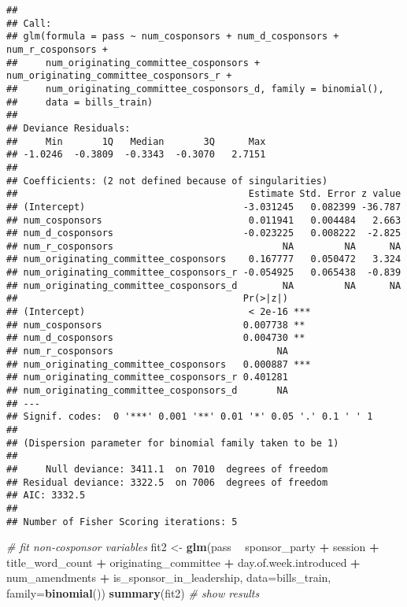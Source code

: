 \documentclass[]{article}
\newenvironment{Shaded}{\begin{snugshade}}{\end{snugshade}}
\newcommand{\KeywordTok}[1]{\textcolor[rgb]{0.13,0.29,0.53}{\textbf{#1}}}
\newcommand{\DataTypeTok}[1]{\textcolor[rgb]{0.13,0.29,0.53}{#1}}
\newcommand{\StringTok}[1]{\textcolor[rgb]{0.31,0.60,0.02}{#1}}
\newcommand{\CommentTok}[1]{\textcolor[rgb]{0.56,0.35,0.01}{\textit{#1}}}
\newcommand{\OperatorTok}[1]{\textcolor[rgb]{0.81,0.36,0.00}{\textbf{#1}}}
\newcommand{\NormalTok}[1]{#1}
\begin{document}
\begin{verbatim}
## 
## Call:
## glm(formula = pass ~ num_cosponsors + num_d_cosponsors + num_r_cosponsors + 
##     num_originating_committee_cosponsors + num_originating_committee_cosponsors_r + 
##     num_originating_committee_cosponsors_d, family = binomial(), 
##     data = bills_train)
## 
## Deviance Residuals: 
##     Min       1Q   Median       3Q      Max  
## -1.0246  -0.3809  -0.3343  -0.3070   2.7151  
## 
## Coefficients: (2 not defined because of singularities)
##                                         Estimate Std. Error z value
## (Intercept)                            -3.031245   0.082399 -36.787
## num_cosponsors                          0.011941   0.004484   2.663
## num_d_cosponsors                       -0.023225   0.008222  -2.825
## num_r_cosponsors                              NA         NA      NA
## num_originating_committee_cosponsors    0.167777   0.050472   3.324
## num_originating_committee_cosponsors_r -0.054925   0.065438  -0.839
## num_originating_committee_cosponsors_d        NA         NA      NA
##                                        Pr(>|z|)    
## (Intercept)                             < 2e-16 ***
## num_cosponsors                         0.007738 ** 
## num_d_cosponsors                       0.004730 ** 
## num_r_cosponsors                             NA    
## num_originating_committee_cosponsors   0.000887 ***
## num_originating_committee_cosponsors_r 0.401281    
## num_originating_committee_cosponsors_d       NA    
## ---
## Signif. codes:  0 '***' 0.001 '**' 0.01 '*' 0.05 '.' 0.1 ' ' 1
## 
## (Dispersion parameter for binomial family taken to be 1)
## 
##     Null deviance: 3411.1  on 7010  degrees of freedom
## Residual deviance: 3322.5  on 7006  degrees of freedom
## AIC: 3332.5
## 
## Number of Fisher Scoring iterations: 5
\end{verbatim}

\begin{Shaded}
\begin{Highlighting}[]
\CommentTok{# fit non-cosponsor variables}
\NormalTok{fit2 <-}\StringTok{ }\KeywordTok{glm}\NormalTok{(pass }\OperatorTok{~}\StringTok{ }\NormalTok{sponsor_party }\OperatorTok{+}\StringTok{ }\NormalTok{session }\OperatorTok{+}\StringTok{ }\NormalTok{title_word_count }\OperatorTok{+}\StringTok{ }\NormalTok{originating_committee }\OperatorTok{+}\StringTok{ }\NormalTok{day.of.week.introduced }\OperatorTok{+}\StringTok{ }\NormalTok{num_amendments }\OperatorTok{+}\StringTok{ }\NormalTok{is_sponsor_in_leadership, }\DataTypeTok{data=}\NormalTok{bills_train, }\DataTypeTok{family=}\KeywordTok{binomial}\NormalTok{())}
\KeywordTok{summary}\NormalTok{(fit2) }\CommentTok{# show results}
\end{Highlighting}
\end{Shaded}
\end{document}
